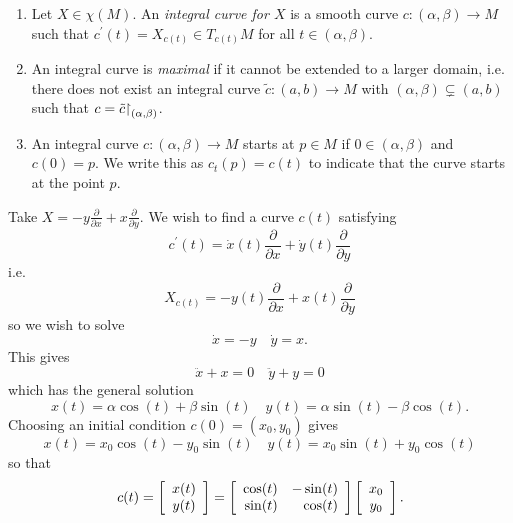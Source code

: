 \begin{defn}
  \begin{enumerate}
    \item{
      Let $X \in \chi(M)$. An
      \emph{integral curve for $X$} is a smooth curve
      $c: (\alpha, \beta) \to M$ such that
      $c^\prime(t) = X_{c(t)} \in T_{c(t)} M$ for all
      $t \in (\alpha, \beta)$.
    }
    \item{
      An integral curve is \emph{maximal} if it
      cannot be extended to a larger domain, i.e. there does not exist an
      integral curve $\tilde{c}: (a, b) \to M$ with
      $(\alpha, \beta) \subsetneq (a, b)$ such that
      $c = \tilde{c}\mathord{\upharpoonright}_{(\alpha, \beta)}$.
    }
    \item{
      An integral curve $c: (\alpha, \beta) \to M$ starts at
      $p \in M$ if $0 \in (\alpha, \beta)$ and $c(0) = p$.
      We write this as $c_t(p) = c(t)$ to indicate that the curve
      starts at the point $p$.
    }
  \end{enumerate}
\end{defn}

\begin{xmpl}
Take
$X = -y \frac{\partial}{\partial x} + x \frac{\partial}{\partial y}$.
We wish to find a curve $c(t)$ satisfying
$$
  c^\prime(t)
= \dot{x}(t) \frac{\partial}{\partial x}
+ \dot{y}(t) \frac{\partial}{\partial y}
$$
i.e.
$$
  X_{c(t)}
= -y(t) \frac{\partial}{\partial x}
+  x(t) \frac{\partial}{\partial y}
$$
so we wish to solve
$$
\dot{x} = -y \quad \dot{y} = x.
$$
This gives
$$
\ddot{x} + x = 0 \quad \ddot{y} + y = 0
$$
which has the general solution
$$
x(t) = \alpha \cos(t) + \beta \sin(t) \quad
y(t) = \alpha \sin(t) - \beta \cos(t).
$$
Choosing an initial condition $c(0) = (x_0, y_0)$ gives
$$
x(t) = x_0 \cos(t) - y_0 \sin(t) \quad
y(t) = x_0 \sin(t) + y_0 \cos(t)
$$
so that
$$
  c(t)
= \left[
    \begin{array}{c}
      x(t) \\
      y(t)
    \end{array}
  \right]
= \left[
    \begin{array}{r r}
      \cos(t) & -\sin(t) \\
      \sin(t) &  \cos(t)
    \end{array}
  \right]
  \left[
    \begin{array}{c}
      x_0 \\
      y_0
    \end{array}
  \right].
$$
\end{xmpl}
